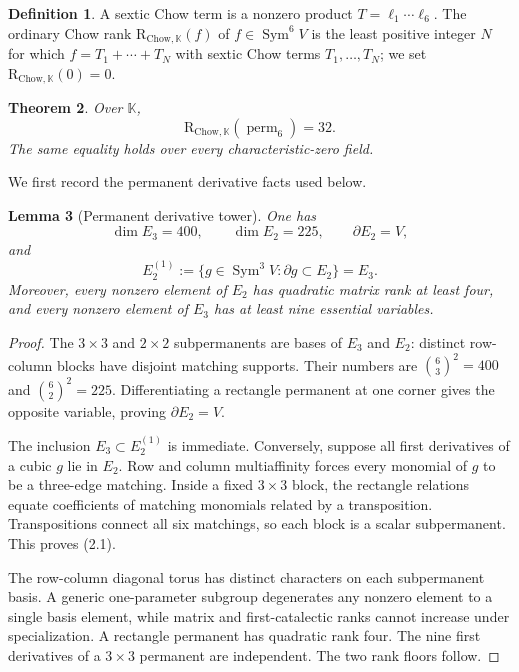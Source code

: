 \documentclass[11pt]{amsart}
\newcommand{\K}{\mathbb{K}}
\newcommand{\Sym}{\operatorname{Sym}}
\newcommand{\perm}{\operatorname{perm}}
\newcommand{\CR}{\mathrm{R}_{\mathrm{Chow},\K}}
\newtheorem{theorem}{Theorem}[section]
\newtheorem{lemma}[theorem]{Lemma}
\theoremstyle{definition}
\newtheorem{definition}[theorem]{Definition}
\begin{document}
\begin{definition}
A sextic Chow term is a nonzero product \(T=\ell_1\cdots\ell_6\). The
ordinary Chow rank \(\CR(f)\) of \(f\in\Sym^6V\) is the least positive
integer \(N\) for which \(f=T_1+\cdots+T_N\) with sextic Chow terms
\(T_1,\ldots,T_N\); we set \(\CR(0)=0\).
\end{definition}

\begin{theorem}\label{thm:main}
Over \(\K\),
\[
 \boxed{\CR(\perm_6)=32.}
\]
The same equality holds over every characteristic-zero field.
\end{theorem}

We first record the permanent derivative facts used below.

\begin{lemma}[Permanent derivative tower]\label{lem:tower}
One has
\[
 \dim E_3=400,\qquad \dim E_2=225,\qquad
 \partial E_2=V,
\]
and
\[
 E_2^{(1)}:=\{g\in\Sym^3V:\partial g\subset E_2\}=E_3. \tag{2.1}
\]
Moreover, every nonzero element of \(E_2\) has quadratic matrix rank at
least four, and every nonzero element of \(E_3\) has at least nine essential
variables.
\end{lemma}

\begin{proof}
The \(3\times3\) and \(2\times2\) subpermanents are bases of \(E_3\) and
\(E_2\): distinct row-column blocks have disjoint matching supports. Their
numbers are \(\binom63^2=400\) and \(\binom62^2=225\). Differentiating a
rectangle permanent at one corner gives the opposite variable, proving
\(\partial E_2=V\).

The inclusion \(E_3\subset E_2^{(1)}\) is immediate. Conversely, suppose
all first derivatives of a cubic \(g\) lie in \(E_2\). Row and column
multiaffinity forces every monomial of \(g\) to be a three-edge matching.
Inside a fixed \(3\times3\) block, the rectangle relations equate
coefficients of matching monomials related by a transposition. Transpositions
connect all six matchings, so each block is a scalar subpermanent. This proves
(2.1).

The row-column diagonal torus has distinct characters on each subpermanent
basis. A generic one-parameter subgroup degenerates any nonzero element to a
single basis element, while matrix and first-catalectic ranks cannot increase
under specialization. A rectangle permanent has quadratic rank four. The
nine first derivatives of a \(3\times3\) permanent are independent. The two
rank floors follow.
\end{proof}
\end{document}
